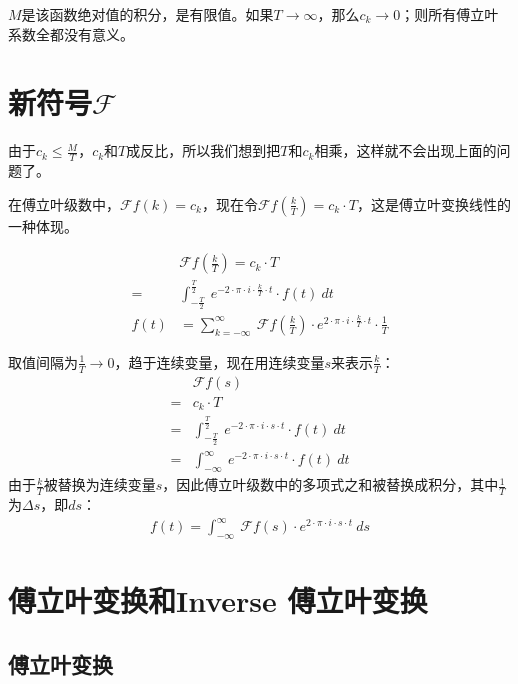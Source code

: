 $M$是该函数绝对值的积分，是有限值。如果$T\rightarrow \infty$，那么$c_k\rightarrow 0$；则所有傅立叶系数全都没有意义。
\section{新符号$\mathcal{F}$}
由于$c_k\leq \frac{M}{T}$，$c_k$和$T$成反比，所以我们想到把$T$和$c_k$相乘，这样就不会出现上面的问题了。

在傅立叶级数中，$\mathcal{F}f(k)=c_k$，现在令$\mathcal{F}f(\frac{k}{T})=c_k\cdot T$，这是傅立叶变换线性的一种体现。

\begin{align*}
	     & \mathcal{F}f(\frac{k}{T})   =    c_k\cdot T                                                                                      \\
	=    & \int_{-\frac{T}{2}}^{\frac{T}{2}}\ e^{-2\cdot \pi\cdot i\cdot \frac{k}{T}\cdot t}\cdot f(t)\ dt                                  \\
	f(t) & =\sum\limits_{k=-\infty}^{\infty}\ \mathcal{F}f(\frac{k}{T})\cdot e^{2\cdot \pi\cdot i\cdot \frac{k}{T}\cdot t}\cdot \frac{1}{T}
\end{align*}

取值间隔为$\frac{1}{T}\rightarrow 0$，趋于连续变量，现在用连续变量$s$来表示$\frac{k}{T}$：
\begin{align*}
	  & \mathcal{F}f(s)                                                                       \\
	= & c_k\cdot T                                                                            \\
	= & \int_{-\frac{T}{2}}^{\frac{T}{2}}\ e^{-2\cdot \pi\cdot i\cdot s\cdot t}\cdot f(t)\ dt \\
	= & \int_{-\infty}^{\infty}\ e^{-2\cdot \pi\cdot i\cdot s\cdot t}\cdot f(t)\ dt
\end{align*}
由于$\frac{k}{T}$被替换为连续变量$s$，因此傅立叶级数中的多项式之和被替换成积分，其中$\frac{1}{T}$为$\Delta s$，即$ds$：
\begin{align*}
	f(t)   =  \int_{-\infty}^{\infty}\ \mathcal{F}f(s)\cdot e^{2\cdot \pi\cdot i\cdot s\cdot t}\ ds
\end{align*}
\section{傅立叶变换和Inverse 傅立叶变换}
\subsection{傅立叶变换}
